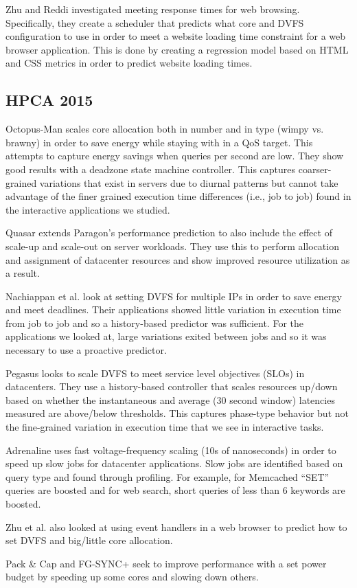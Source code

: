 Zhu and Reddi \cite{zhu-hpca13} investigated meeting response times for 
web browsing.  Specifically, they create a scheduler that predicts what core
and DVFS configuration to use in order to meet a website loading time
constraint for a web browser application. This is done by creating a regression
model based on HTML and CSS metrics in order to predict website loading times.

\subsection{HPCA 2015}

Octopus-Man \cite{octopusman-hpca15} scales core allocation both in number and
in type (wimpy vs. brawny) in order to save energy while staying with in a QoS
target. This attempts to capture energy savings when queries per second are
low. They show good results with a deadzone state machine controller. This
captures coarser-grained variations that exist in servers due to diurnal
patterns but cannot take advantage of the finer grained execution time
differences (i.e., job to job) found in the interactive applications we
studied.

Quasar \cite{quasar-asplos14} extends Paragon's \cite{paragon-asplos13}
performance prediction to also include the effect of scale-up and scale-out on
server workloads. They use this to perform allocation and assignment of
datacenter resources and show improved resource utilization as a result.

Nachiappan et al. \cite{nachiappan-hpca15} look at setting DVFS for multiple
IPs in order to save energy and meet deadlines. Their applications showed
little variation in execution time from job to job and so a history-based
predictor was sufficient. For the applications we looked at, large variations
exited between jobs and so it was necessary to use a proactive predictor.

Pegasus \cite{pegasus-isca14} looks to scale DVFS to meet service level
objectives (SLOs) in datacenters. They use a history-based controller that
scales resources up/down based on whether the instantaneous and average (30 second window)
latencies measured are above/below thresholds. This captures phase-type
behavior but not the fine-grained variation in execution time that we see in
interactive tasks.

Adrenaline \cite{adrenaline-hpca15} uses fast voltage-frequency scaling (10s of
nanoseconds) in order to speed up slow jobs for datacenter applications. Slow
jobs are identified based on query type and found through profiling. For
example, for Memcached ``SET'' queries are boosted and for web search, short
queries of less than 6 keywords are boosted.

Zhu et al. \cite{eqos-hpca15} also looked at using event handlers in a web
browser to predict how to set DVFS and big/little core allocation.

Pack \& Cap \cite{packandcap-micro44} and FG-SYNC+ \cite{fgsync-micro14} seek
to improve performance with a set power budget by speeding up some cores and
slowing down others.
